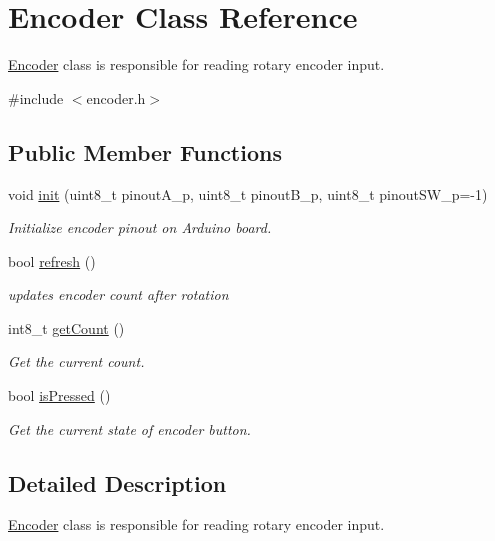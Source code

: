 \hypertarget{class_encoder}{}\section{Encoder Class Reference}
\label{class_encoder}


\hyperlink{class_encoder}{Encoder} class is responsible for reading rotary encoder input.  




{\ttfamily \#include $<$encoder.\+h$>$}

\subsection*{Public Member Functions}
\begin{DoxyCompactItemize}
\item 
void \hyperlink{class_encoder_a430e95a76f5b958b5350992c065d0b29}{init} (uint8\+\_\+t pinout\+A\+\_\+p, uint8\+\_\+t pinout\+B\+\_\+p, uint8\+\_\+t pinout\+S\+W\+\_\+p=-\/1)
\begin{DoxyCompactList}\small\item\em Initialize encoder pinout on Arduino board. \end{DoxyCompactList}\item 
bool \hyperlink{class_encoder_a85178b6e0978a7c342edbdce308d4abf}{refresh} ()
\begin{DoxyCompactList}\small\item\em updates encoder count after rotation \end{DoxyCompactList}\item 
int8\+\_\+t \hyperlink{class_encoder_a5e3fddf160e67d970c9c2cd57be5709a}{get\+Count} ()
\begin{DoxyCompactList}\small\item\em Get the current count. \end{DoxyCompactList}\item 
bool \hyperlink{class_encoder_ac7046bc89fc381018597bbba0cc0026e}{is\+Pressed} ()
\begin{DoxyCompactList}\small\item\em Get the current state of encoder button. \end{DoxyCompactList}\end{DoxyCompactItemize}


\subsection{Detailed Description}
\hyperlink{class_encoder}{Encoder} class is responsible for reading rotary encoder input. 

